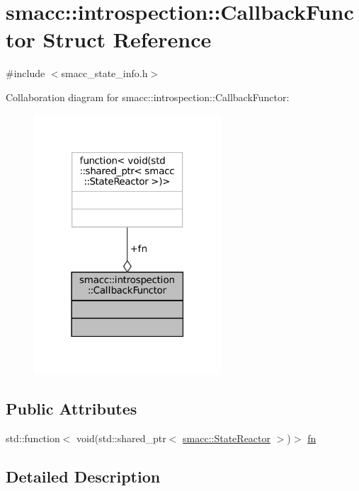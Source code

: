 \hypertarget{structsmacc_1_1introspection_1_1CallbackFunctor}{}\section{smacc\+:\+:introspection\+:\+:Callback\+Functor Struct Reference}
\label{structsmacc_1_1introspection_1_1CallbackFunctor}


{\ttfamily \#include $<$smacc\+\_\+state\+\_\+info.\+h$>$}



Collaboration diagram for smacc\+:\+:introspection\+:\+:Callback\+Functor\+:
\nopagebreak
\begin{figure}[H]
\begin{center}
\leavevmode
\includegraphics[width=198pt]{structsmacc_1_1introspection_1_1CallbackFunctor__coll__graph}
\end{center}
\end{figure}
\subsection*{Public Attributes}
\begin{DoxyCompactItemize}
\item 
std\+::function$<$ void(std\+::shared\+\_\+ptr$<$ \hyperlink{classsmacc_1_1StateReactor}{smacc\+::\+State\+Reactor} $>$)$>$ \hyperlink{structsmacc_1_1introspection_1_1CallbackFunctor_a459e9ea2fb050739b927c4722c843e51}{fn}
\end{DoxyCompactItemize}


\subsection{Detailed Description}


